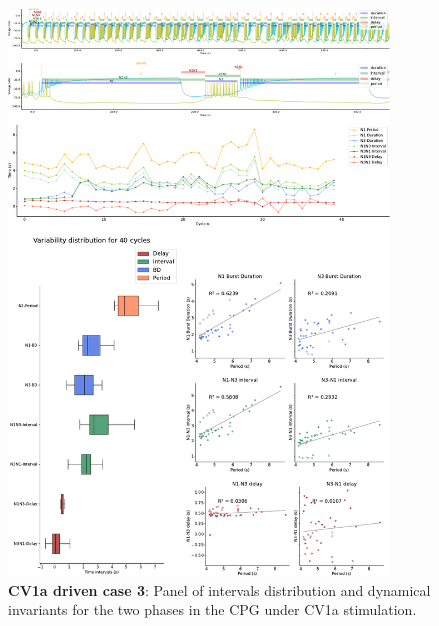 \begin{figure}[htbp]
	\centering
	\includegraphics[width=0.9\textwidth]{./img/invariants/data/SUSSEX/CV1a_driven4/images/2phases/panel_with_intervals.pdf}
	\caption{\textbf{CV1a driven case 3}: Panel of intervals distribution and dynamical invariants for the two phases in the CPG under CV1a stimulation.}
	\label{fig:cv1a 4 2phases}
\end{figure}




